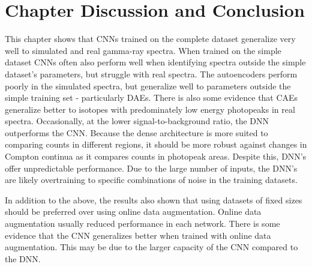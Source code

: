 \section{Chapter Discussion and Conclusion}

This chapter shows that CNNs trained on the complete dataset generalize very well to simulated and real gamma-ray spectra. When trained on the simple dataset CNNs often also perform well when identifying spectra outside the simple dataset's parameters, but struggle with real spectra. The autoencoders perform poorly in the simulated spectra, but generalize well to parameters outside the simple training set - particularly DAEs. There is also some evidence that CAEs generalize better to isotopes with predominately low energy photopeaks in real spectra. Occasionally, at the lower signal-to-background ratio, the DNN outperforms the CNN. Because the dense architecture is more suited to comparing counts in different regions, it should be more robust against changes in Compton continua as it compares counts in photopeak areas. Despite this, DNN's offer unpredictable performance. Due to the large number of inputs, the DNN's are likely overtraining to specific combinations of noise in the training datasets.

In addition to the above, the results also shown that using datasets of fixed sizes should be preferred over using online data augmentation. Online data augmentation usually reduced performance in each network. There is some evidence that the CNN generalizes better when trained with online data augmentation. This may be due to the larger capacity of the CNN compared to the DNN. 





